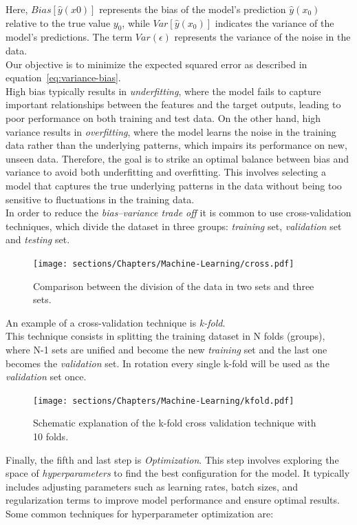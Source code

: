 Here, $Bias[\hat{y}(x0)]$ represents the bias of the model's prediction $\hat{y}(x_0)$ relative to the true value $y_0$, while 
$Var[\hat{y}(x_0)]$ indicates the variance of the model's predictions. The term $Var(\epsilon)$ represents the variance of the noise in the data.\\
Our objective is to minimize the expected squared error as described in equation~\ref{eq:variance-bias}.\\
High bias typically results in \textit{underfitting}, where the model fails to capture important relationships between the 
features and the target outputs, leading to poor performance on both training and test data. On the other hand, high 
variance results in \textit{overfitting}, where the model learns the noise in the training data rather than 
the underlying patterns, which impairs its performance on new, unseen data.
Therefore, the goal is to strike an optimal balance between bias and variance to avoid both underfitting and overfitting. 
This involves selecting a model that captures the true underlying patterns in the data without being too sensitive to fluctuations 
in the training data.\\
In order to reduce the \textit{bias–variance trade off} it is common to use cross-validation techniques, 
which divide the dataset in three groups: \textit{training} set, \textit{validation} set and \textit{testing} set.

\begin{figure}[h]
\centering
\texttt{[image: sections/Chapters/Machine-Learning/cross.pdf]}
\caption{Comparison between the division of the data in two sets and three sets.}
\end{figure}

An example of a cross-validation technique is \textit{k-fold}.\\
This technique consists in splitting the training dataset in N folds (groups), where N-1 sets are unified and become the new \textit{training} set 
and the last one becomes the \textit{validation} set.
In rotation every single k-fold will be used as the \textit{validation} set once.\\

\begin{figure}[h]
\centering
\texttt{[image: sections/Chapters/Machine-Learning/kfold.pdf]}
\caption{Schematic explanation of the k-fold cross validation technique with 10 folds.}
\end{figure}


Finally, the fifth and last step is \textit{Optimization}. This step involves exploring the space of \textit{hyperparameters} to find the best 
configuration for the model. It typically includes adjusting parameters such as learning rates, batch sizes, and regularization terms to improve 
model performance and ensure optimal results.\\
Some common techniques for hyperparameter optimization are:

